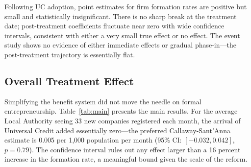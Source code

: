 \documentclass[12pt]{article}
\begin{document}
Following UC adoption, point estimates for firm formation rates are positive but small and statistically insignificant. There is no sharp break at the treatment date; post-treatment coefficients fluctuate near zero with wide confidence intervals, consistent with either a very small true effect or no effect. The event study shows no evidence of either immediate effects or gradual phase-in---the post-treatment trajectory is essentially flat.

\subsection{Overall Treatment Effect}

Simplifying the benefit system did not move the needle on formal entrepreneurship. Table~\ref{tab:main} presents the main results. For the average Local Authority seeing 33 new companies registered each month, the arrival of Universal Credit added essentially zero---the preferred Callaway-Sant'Anna estimate is 0.005 per 1,000 population per month (95\% CI: $[-0.032, 0.042]$, $p = 0.79$). The confidence interval rules out any effect larger than a 16 percent increase in the formation rate, a meaningful bound given the scale of the reform.
\end{document}
